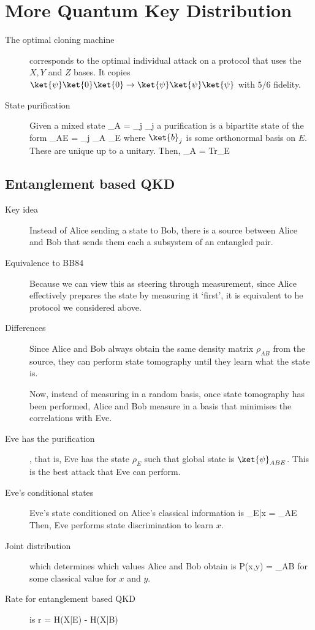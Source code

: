 \section{More Quantum Key Distribution}
\begin{description}
\item[The optimal cloning machine] corresponds to the optimal individual attack on a protocol that uses the $X,Y$ and $Z$ bases. It copies $\ket{\psi} \ket{0}\ket{0} \rightarrow \ket{\psi} \ket{\psi} \ket{\psi} $ with $5/6$ fidelity. 

\item[State purification] Given a mixed state
\beq
\rho_A = \sum_j \lambda_j 
\eeq
a purification is a bipartite state of the form 
\beq
\ket{\psi}_{AE} = \sum_j   _A \otimes {}_E
\eeq
where $\ket{b}_j$ is some orthonormal basis on $E$. These are unique up to a unitary. Then, 
\beq
\rho_A = \mbox{Tr}_E 
\eeq

\end{description}

\subsection{Entanglement based QKD}
\begin{description}
\item[Key idea] Instead of Alice sending a state to Bob, there is a source between Alice and Bob that sends them each a subsystem of an entangled pair. 

\item[Equivalence to BB84] Because we can view this as steering through measurement, since Alice effectively prepares the state by measuring it `first', it is equivalent to he protocol we considered above. 

\item[Differences] Since Alice and Bob always obtain the same density matrix $\rho_{AB}$ from the source, they can perform state tomography until they learn what the state is. 

Now, instead of measuring in a random basis, once state tomography has been performed, Alice and Bob measure in a basis that minimises the correlations with Eve. 

\item[Eve has the purification], that is, Eve has the state $\rho_E$ such that global state is $\ket{\psi}_{ABE}$. This is the best attack that Eve can perform. 

\item[Eve's conditional states] Eve's state conditioned on Alice's classical information is
\beq
\rho_{E|x} =  \rho_{AE} 
\eeq
Then, Eve performs state discrimination to learn $x$. 

\item[Joint distribution] which determines which values Alice and Bob obtain is
\beq
P(x,y) =  \rho_{AB} 
\eeq
for some classical value for $x$ and $y$. 

\item[Rate for entanglement based QKD] is
\beq
r = H(X|E) - H(X|B)
\eeq

\end{description}
